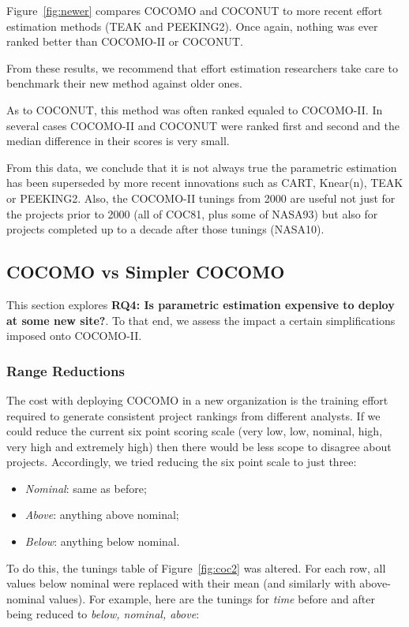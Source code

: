 \documentclass[smallcondesed]{svjour3}
\newcommand{\bi}{\begin{itemize}[leftmargin=0.4cm]}
\newcommand{\ei}{\end{itemize}}
\newcommand{\fig}[1]{Figure~\ref{fig:#1}}
\begin{document}
\fig{newer} compares COCOMO and COCONUT to more recent effort estimation methods (TEAK and PEEKING2). Once again,   nothing was ever ranked better than COCOMO-II or COCONUT.


From these results,
we recommend that effort estimation researchers take care to benchmark
their new method against older ones.




As to COCONUT, this method
was often ranked equaled to COCOMO-II.  
In several cases  COCOMO-II and COCONUT were ranked first and second and
the median difference in their scores is very small.
 


From this data, we conclude that it is not
always true the parametric estimation has been
superseded by more recent innovations such
as CART, Knear(n), TEAK or PEEKING2. Also, the COCOMO-II tunings from 2000
are useful not just for the projects prior to 2000
(all of COC81, plus some of NASA93)
but also for projects completed up to a decade after
those tunings (NASA10).






\subsection{COCOMO vs Simpler COCOMO}\label{sect:simpler}
This section explores {\bf RQ4:
Is parametric estimation expensive to deploy
at some new site?}. To that end,
we assess the impact
a certain simplifications imposed onto COCOMO-II. 




\subsubsection{Range Reductions}
The cost with deploying COCOMO in a new
organization is the training effort required to generate consistent project
rankings from different analysts. If we could reduce 
the current six
point scoring scale (very low, low, nominal, high, very high and extremely high)
then there would be less scope 
to disagree about projects. 
Accordingly,  we tried
reducing the  six point scale to just three:
\bi
\item {\em Nominal}: same as before;
\item {\em Above}: anything above nominal;
\item {\em Below}: anything below nominal.
\ei
To do  this, the tunings table of
\fig{coc2} was altered. For each row, all values
below nominal were replaced with their mean (and
similarly with above-nominal values).  For example,
here are the tunings for {\em time} before and after
being reduced to {\em below, nominal, above}:
\end{document}
